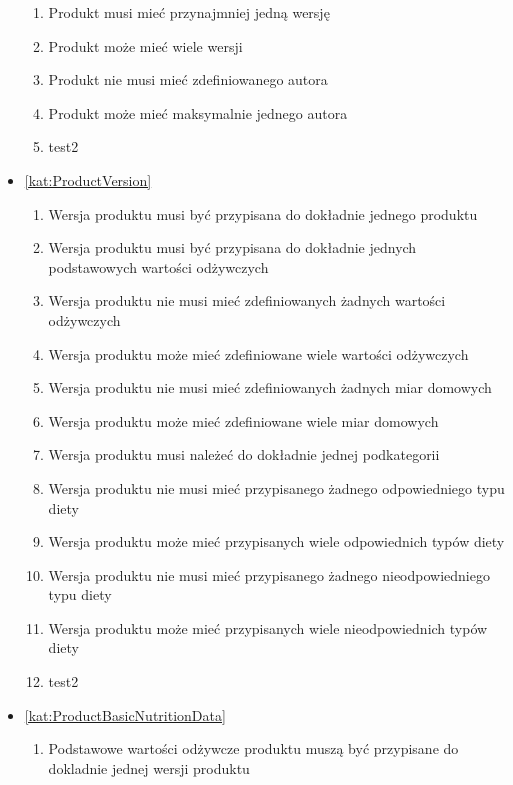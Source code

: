 \begin{itemize}[label={\textbf{Reguły dla}}, wide, labelwidth=!, labelindent=0pt]
\begin{enumerate}[label={\textbf{REG/\protect\threedigits{\arabic{enumi}}}}, wide, labelwidth=!, align=left, leftmargin=3cm, resume]
        \item Produkt musi mieć przynajmniej jedną wersję
        \item Produkt może mieć wiele wersji
        \item Produkt nie musi mieć zdefiniowanego autora
        \item Produkt może mieć maksymalnie jednego autora
        \item test2
    \end{enumerate}
    \item\ref{kat:ProductVersion}
    \begin{enumerate}[label={\textbf{REG/\protect\threedigits{\arabic{enumi}}}}, wide, labelwidth=!, align=left, leftmargin=3cm, resume]
        \item Wersja produktu musi być przypisana do dokładnie jednego produktu
        \item Wersja produktu musi być przypisana do dokładnie jednych podstawowych wartości odżywczych
        \item Wersja produktu nie musi mieć zdefiniowanych żadnych wartości odżywczych
        \item Wersja produktu może mieć zdefiniowane wiele wartości odżywczych
        \item Wersja produktu nie musi mieć zdefiniowanych żadnych miar domowych
        \item Wersja produktu może mieć zdefiniowane wiele miar domowych
        \item Wersja produktu musi należeć do dokładnie jednej podkategorii
        \item Wersja produktu nie musi mieć przypisanego żadnego odpowiedniego typu diety
        \item Wersja produktu może mieć przypisanych wiele odpowiednich typów diety
        \item Wersja produktu nie musi mieć przypisanego żadnego nieodpowiedniego typu diety
        \item Wersja produktu może mieć przypisanych wiele nieodpowiednich typów diety
        \item test2
    \end{enumerate}
    \item\ref{kat:ProductBasicNutritionData}
    \begin{enumerate}[label={\textbf{REG/\protect\threedigits{\arabic{enumi}}}}, wide, labelwidth=!, align=left, leftmargin=3cm, resume]
        \item Podstawowe wartości odżywcze produktu muszą być przypisane do dokladnie jednej wersji produktu

\end{enumerate}
\end{itemize}
